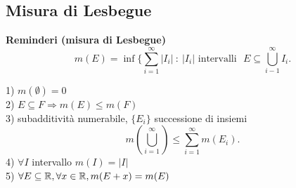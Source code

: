 \documentclass{article}
\begin{document}

\maketitle
	\newpage
	\subsection{Misura di Lesbegue}
	\textbf{Reminderi (misura di Lesbegue)}\\
	\[
	m(E) = \inf\{ \sum^\infty_{i=1} |I_i| \ :\ |I_i| \text{ intervalli} \ \ \ E\subseteq \bigcup^\infty_{i-1}I_i 
	.\] 
	\begin{prop}
	1) $m(\emptyset) = 0$	\\
	2) $E\subseteq F \Rightarrow m(E)\leq m(F)$ \\
	3) subadditività numerabile, $\{E_i\}$ successione di insiemi
	 \[
		 m(\bigcup^\infty_{i=1}) \leq \sum^{\infty}_{i=1}m(E_i)
	.\] 
	4) $\forall I$ intervallo  $m(I) = |I|$\\
	5)  $\forall E\subseteq \mathbb{R}, \forall x\in\mathbb{R}, m(E + x) = m(E)$
	\end{prop}
\end{document}

